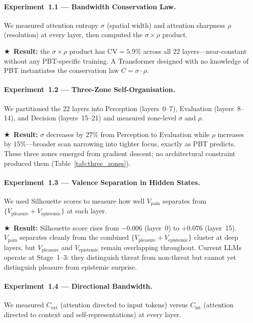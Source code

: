 \documentclass[12pt,a4paper]{article}
\newcommand{\Cext}{C_{\mathrm{ext}}}
\newcommand{\Cint}{C_{\mathrm{int}}}
\newcommand{\vpain}{V_{\mathrm{pain}}}
\newcommand{\vpleasure}{V_{\mathrm{pleasure}}}
\newcommand{\vepi}{V_{\mathrm{epistemic}}}
\newcommand{\starred}{\textbf{\textcolor{pbtblue}{$\bigstar$}}~}
\begin{document}
\paragraph{Experiment~1.1 --- Bandwidth Conservation Law.}
We measured attention entropy $\sigma$ (spatial width) and attention sharpness
$\rho$ (resolution) at every layer, then computed the $\sigma\!\times\!\rho$
product.

\starred\textbf{Result:} the $\sigma\!\times\!\rho$ product has
$\mathrm{CV} = \mathbf{5.9\%}$ across all 22 layers---near-constant without
any PBT-specific training. A Transformer designed with no knowledge of PBT
instantiates the conservation law $C = \sigma\cdot\rho$.

\paragraph{Experiment~1.2 --- Three-Zone Self-Organisation.}
We partitioned the 22 layers into Perception (layers~0--7), Evaluation
(layers~8--14), and Decision (layers~15--21) and measured zone-level $\sigma$
and $\rho$.

\starred\textbf{Result:} $\sigma$ decreases by $27\%$ from Perception to
Evaluation while $\rho$ increases by $15\%$---broader scan narrowing into
tighter focus, exactly as PBT predicts. These three zones emerged from
gradient descent; no architectural constraint produced them
(Table~\ref{tab:three_zones}).

\paragraph{Experiment~1.3 --- Valence Separation in Hidden States.}
We used Silhouette scores to measure how well $\vpain$ separates from
$\{\vpleasure + \vepi\}$ at each layer.

\starred\textbf{Result:} Silhouette score rises from $-0.006$ (layer~0) to
$+0.076$ (layer~15). $\vpain$ separates cleanly from the combined
$\{\vpleasure + \vepi\}$ cluster at deep layers, but $\vpleasure$ and $\vepi$
remain overlapping throughout. Current LLMs operate at Stage~1--3: they
distinguish threat from non-threat but cannot yet distinguish pleasure from
epistemic surprise.

\paragraph{Experiment~1.4 --- Directional Bandwidth.}
We measured $\Cext$ (attention directed to input tokens) versus $\Cint$
(attention directed to context and self-representations) at every layer.
\end{document}
